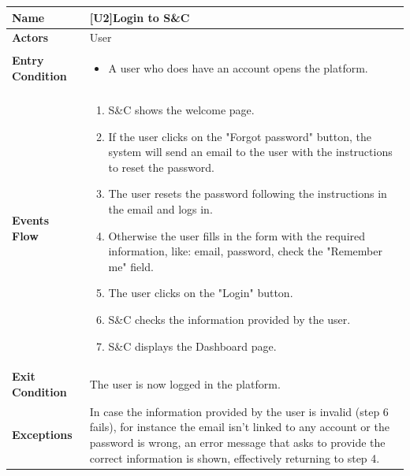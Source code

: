 \begin{center}
    \begin{tabular}{|p{9em}|p{27em}|}
        \hline
        \rowcolor{bluepoli!40}
        \textbf{Name} & \textbf{[U2]Login to S\&C} \\
        \hline
        \textbf{Actors} & User \\
        \hline
        \textbf{Entry Condition} & 
        \begin{itemize}
            \item A user who does have an account opens the platform.
        \end{itemize} \\
        \hline
        \textbf{Events Flow} & 
        \begin{enumerate}
            \item S\&C shows the welcome page.
            \item If the user clicks on the "Forgot password" button, the system will send an email to the user with the instructions to reset the password.
            \item The user resets the password following the instructions in the email and logs in.
            \item Otherwise the user fills in the form with the required information, like: email, password, check the "Remember me" field.
            \item The user clicks on the "Login" button.
            \item S\&C checks the information provided by the user.
            \item S\&C displays the Dashboard page. 
        \end{enumerate} \\
        \hline
        \textbf{Exit Condition} & The user is now logged in the platform. \\
        \hline
        \textbf{Exceptions} & In case the information provided by the user is invalid (step 6 fails), for instance the email isn't linked to
        any account or the password is wrong, an error message that asks to provide the correct information is shown, effectively 
        returning to step 4. \\
        \hline
    \end{tabular}
\end{center}

